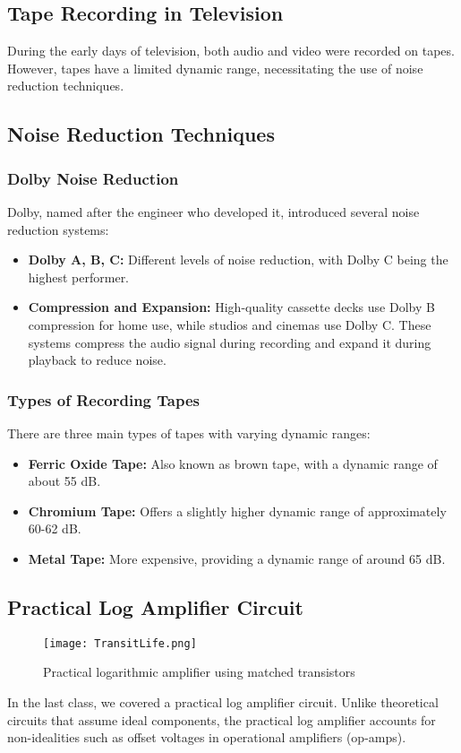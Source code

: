\documentclass[a4paper,9pt,twoside,openany,twocolumn]{memoir}
\begin{document}
\subsection{Tape Recording in Television}

During the early days of television, both audio and video were recorded on tapes. However, tapes have a limited dynamic range, necessitating the use of noise reduction techniques.

\subsection{Noise Reduction Techniques}

\subsubsection{Dolby Noise Reduction}

Dolby, named after the engineer who developed it, introduced several noise reduction systems:

\begin{itemize}
    \item \textbf{Dolby A, B, C:} Different levels of noise reduction, with Dolby C being the highest performer.
    \item \textbf{Compression and Expansion:} High-quality cassette decks use Dolby B compression for home use, while studios and cinemas use Dolby C. These systems compress the audio signal during recording and expand it during playback to reduce noise.
\end{itemize}

\subsubsection{Types of Recording Tapes}

There are three main types of tapes with varying dynamic ranges:

\begin{itemize}
    \item \textbf{Ferric Oxide Tape:} Also known as brown tape, with a dynamic range of about 55 dB.
    \item \textbf{Chromium Tape:} Offers a slightly higher dynamic range of approximately 60-62 dB.
    \item \textbf{Metal Tape:} More expensive, providing a dynamic range of around 65 dB.
\end{itemize}

\subsection{Practical Log Amplifier Circuit}
\begin{figure}[H]
    \centering
    \texttt{[image: TransitLife.png]}
    \caption{Practical logarithmic amplifier using matched transistors}
    \label{fig:question_image}
\end{figure}
In the last class, we covered a practical log amplifier circuit. Unlike theoretical circuits that assume ideal components, the practical log amplifier accounts for non-idealities such as offset voltages in operational amplifiers (op-amps).
\end{document}
